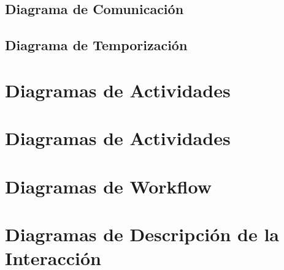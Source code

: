 \newpage

\subsection{Diagrama de Comunicación}

\newpage

\subsection{Diagrama de Temporización}

\newpage

\section{Diagramas de Actividades}

\newpage

\section{Diagramas de Actividades}

\newpage

\section{Diagramas de Workflow}

\newpage

\section{Diagramas de Descripción de la Interacción}

\newpage
